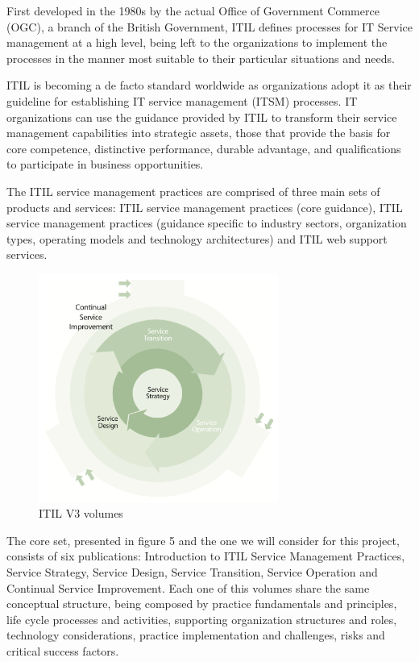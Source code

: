 First developed in the 1980s by the actual Office of Government Commerce (OGC), a branch of the British Government, ITIL defines processes for IT Service management at a high level, being left to the organizations to implement the processes in the manner most suitable to their particular situations and needs.\par
ITIL is becoming a de facto standard worldwide as organizations adopt it as their guideline for establishing IT service management (ITSM) processes. IT organizations can use the guidance provided by ITIL to transform their service management capabilities into strategic assets, those that provide the basis for core competence, distinctive performance, durable advantage, and qualifications to participate in business opportunities.\par
The ITIL service management practices are comprised of three main sets of products and services: ITIL service management practices (core guidance), ITIL service management practices (guidance specific to industry sectors, organization types, operating models and technology architectures) and ITIL web support services.\par

\begin{figure}
\centering
\includegraphics[width=0.7\textwidth]{img/ITILVolumes.png}
\caption{ITIL V3 volumes}
\end{figure}

The core set, presented in figure 5 and the one we will consider for this project, consists of six publications: Introduction to ITIL Service Management Practices, Service Strategy, Service Design, Service Transition, Service Operation and Continual Service Improvement. Each one of this volumes share the same conceptual structure, being composed by practice fundamentals and principles, life cycle processes and activities, supporting organization structures and roles, technology considerations, practice implementation and challenges, risks and critical success factors.

